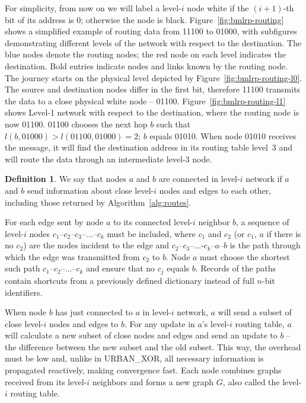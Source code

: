 \documentclass[conference]{IEEEtran}
\theoremstyle{definition}
\newtheorem{defn}{Definition}
\newcommand{\urbanxor}{URBAN\_XOR}
\begin{document}
For simplicity, from now on we will label a level-$i$ node white if the $(i+1)$-th bit of its address is 0; otherwise the node is black. Figure~\ref{fig:bmlrp-routing} shows a simplified example of routing data from 11100 to 01000, with subfigures demonstrating different levels of the network with respect to the destination. The blue nodes denote the routing nodes; the red node on each level indicates the destination. Bold entries indicate nodes and links known by the routing node. The journey starts on the physical level depicted by Figure~\ref{fig:bmlrp-routing-l0}. The source and destination nodes differ in the first bit, therefore 11100 transmits the data to a close physical white node -- 01100. Figure~\ref{fig:bmlrp-routing-l1} shows Level-1 network with respect to the destination, where the routing node is now 01100. 01100 chooses the next hop $b$ such that $l(b, 01000) > l(01100, 01000) = 2$; $b$ equals 01010. When node 01010 receives the message, it will find the destination address in its routing table level~3 and will route the data through an intermediate level-3 node.

\begin{defn}
    We say that nodes $a$ and $b$ are connected in level-$i$ network if $a$ and $b$ send information about close level-$i$ nodes and edges to each other, including those returned by Algorithm~\ref{alg:routes}.
    
    \label{defn:connected}
\end{defn}

For each edge sent by node $a$ to its connected level-$i$ neighbor $b$, a sequence of level-$i$ nodes $c_1$--$c_2$--$c_3$--...--$c_k$ must be included, where $c_1$ and $c_2$ (or $c_1$, $a$ if there is no $c_2$) are the nodes incident to the edge and $c_2$--$c_3$--...-$c_k$--$a$--$b$ is the path through which the edge was transmitted from $c_2$ to $b$. Node $a$ must choose the shortest such path $c_1$--$c_2$--...--$c_k$ and ensure that no $c_j$ equals $b$. Records of the paths contain shortcuts from a previously defined dictionary instead of full $n$-bit identifiers.

When node $b$ has just connected to $a$ in level-$i$ network, $a$ will send a subset of close level-$i$ nodes and edges to $b$. For any update in $a$'s level-$i$ routing table, $a$ will calculate a new subset of close nodes and edges and send an update to $b$ -- the difference between the new subset and the old subset. This way, the overhead must be low and, unlike in \urbanxor, all necessary information is propagated reactively, making convergence fast. Each node combines graphs received from its level-$i$ neighbors and forms a new graph $G$, also called the level-$i$ routing table.
\end{document}
